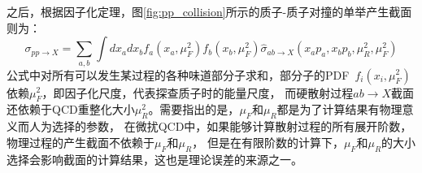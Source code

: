 之后，根据因子化定理\cite{Collins:1989gx}，图\ref{fig:pp_collision}所示的质子-质子对撞的单举产生截面则为：
\begin{equation}
 \sigma_{pp\rightarrow X}=\sum_{a,b}\int dx_adx_bf_a(x_a,\mu_F^2)f_b(x_b,\mu_F^2)\hat{\sigma}_{ab\rightarrow X}(x_ap_a,x_bp_b,\mu_R^2,\mu_F^2)
\end{equation}
公式中对所有可以发生某过程的各种味道部分子求和，部分子的PDF~$f_i(x_i,\mu_F^2)$依赖$\mu_F^2$，即因子化尺度，代表探查质子时的能量尺度，
而硬散射过程$ab\rightarrow X$截面还依赖于QCD重整化大小$\mu_R^2$。需要指出的是，$\mu_F$和$\mu_R$都是为了计算结果有物理意义而人为选择的参数，
在微扰QCD中，如果能够计算散射过程的所有展开阶数，物理过程的产生截面不依赖于$\mu_F$和$\mu_R$，
但是在有限阶数的计算下，$\mu_F$和$\mu_R$的大小选择会影响截面的计算结果，这也是理论误差的来源之一。
